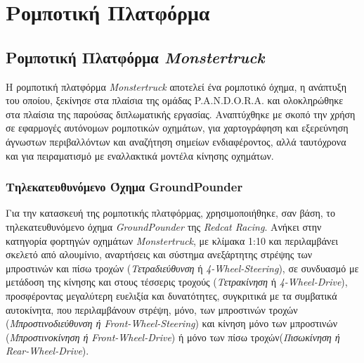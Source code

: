 
\chapter{Ρομποτική Πλατφόρμα} %


\label{Chapter2} %


\section{Ρομποτική Πλατφόρμα \textit{Monstertruck}} \label{sec:robotic_platform}
Η ρομποτική πλατφόρμα \textit{Monstertruck} αποτελεί ένα ρομποτικό όχημα, η ανάπτυξη του οποίου, ξεκίνησε στα πλαίσια της ομάδας P.A.N.D.O.R.A. και ολοκληρώθηκε στα πλαίσια της παρούσας διπλωματικής εργασίας. Αναπτύχθηκε με σκοπό την χρήση σε εφαρμογές αυτόνομων ρομποτικών οχημάτων, για χαρτογράφηση και εξερεύνηση άγνωστων περιβαλλόντων και αναζήτηση σημείων ενδιαφέροντος, αλλά ταυτόχρονα και για πειραματισμό με εναλλακτικά μοντέλα κίνησης οχημάτων.

\subsection{Τηλεκατευθυνόμενο Όχημα GroundPounder} \label{ssec:groundpounder}
Για την κατασκευή της ρομποτικής πλατφόρμας, χρησιμοποιήθηκε, σαν βάση, το τηλεκατευθυνόμενο όχημα \textit{GroundPounder} της \textit{Redcat Racing}. Ανήκει στην κατηγορία φορτηγών οχημάτων \textit{Monstertruck}, με κλίμακα 1:10 και περιλαμβάνει σκελετό από αλουμίνιο, αναρτήσεις και σύστημα ανεξάρτητης στρέψης των μπροστινών και πίσω τροχών (\textit{Τετραδιεύθυνση} ή \textit{4-Wheel-Steering}), σε συνδυασμό με μετάδοση της κίνησης και στους τέσσερις τροχούς (\textit{Τετρακίνηση} ή \textit{4-Wheel-Drive}), προσφέροντας μεγαλύτερη ευελιξία και δυνατότητες, συγκριτικά με τα συμβατικά αυτοκίνητα, που περιλαμβάνουν στρέψη, μόνο, των μπροστινών τροχών (\textit{Μπροστινοδιεύθυνση ή Front-Wheel-Steering}) και κίνηση μόνο των μπροστινών (\textit{Μπροστινοκίνηση ή Front-Wheel-Drive}) ή μόνο των πίσω τροχών(\textit{Πισωκίνηση ή Rear-Wheel-Drive}).

